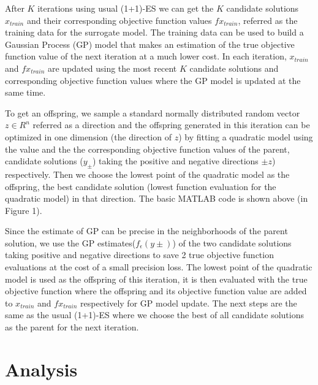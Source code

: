 After $K$ iterations using usual (1+1)-ES we can get the $K$ candidate solutions  $x_{train}$ and their corresponding objective function values $fx_{train}$, referred as the training data for the surrogate model. The training data can be used to build a Gaussian Process (GP) model that makes an estimation of the true objective function value of the next iteration at a much lower cost. In each iteration, $x_{train}$ and $fx_{train}$ are updated using the most recent $K$ candidate solutions and corresponding objective function values where the GP model is updated at the same time. 

To get an offspring, we sample a standard normally distributed random vector $z \in R^n$ referred as a direction and the offspring generated in this iteration can be optimized in one dimension (the direction of $z$) by fitting a quadratic model using the value and the the corresponding objective function values of the parent, candidate solutions ($y_{\pm}$) taking the positive and negative directions $\pm z$) respectively. Then we choose the lowest point of the quadratic model as the offspring, the best candidate solution (lowest function evaluation for the quadratic model) in that direction. The basic MATLAB code is shown above (in Figure 1).

Since the estimate of GP can be precise in the neighborhoods of the parent solution, we use the GP estimates($f_{\epsilon}(y \pm)$) of the two candidate solutions taking positive and negative directions to save 2 true objective function evaluations at the cost of a small precision loss. 
The lowest point of the quadratic model is used as the offspring of this iteration, it is then evaluated with the true objective function where the offspring and its objective function value are added to $x_{train}$ and $fx_{train}$ respectively for GP model update. The next steps are the same as the usual (1+1)-ES where we choose the best of all candidate solutions as the parent for the next iteration. 





\section{Analysis}


